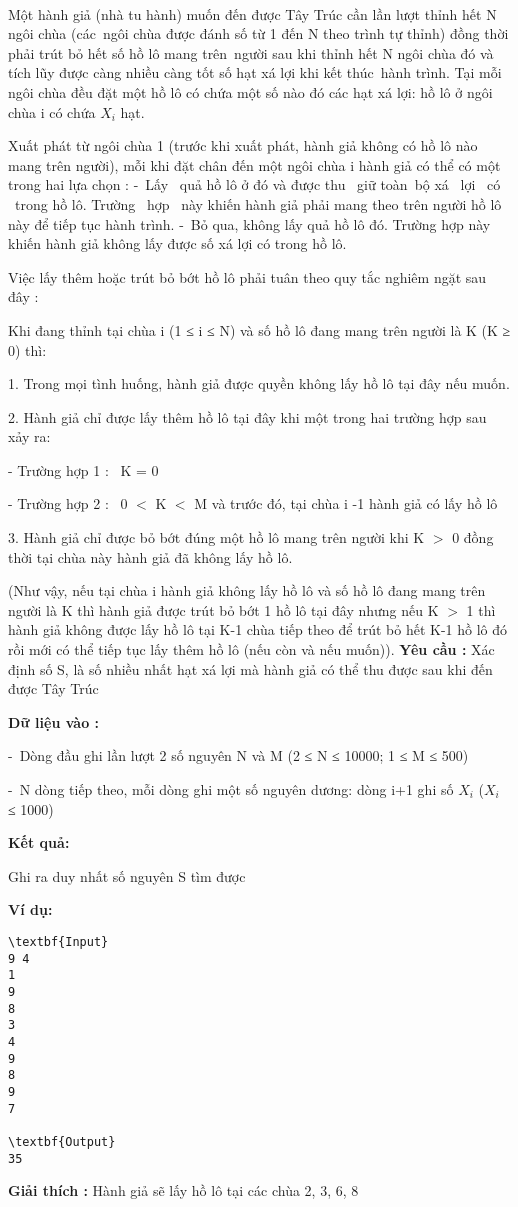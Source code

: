 

 

Một hành giả (nhà tu hành) muốn đến được Tây Trúc cần lần lượt thỉnh hết N ngôi chùa (các ngôi chùa được đánh số từ 1 đến N theo trình tự thỉnh) đồng thời phải trút bỏ hết số hồ lô mang trên người sau khi thỉnh hết N ngôi chùa đó và tích lũy được càng nhiều càng tốt số hạt xá lợi khi kết thúc hành trình. Tại mỗi ngôi chùa đều đặt một hồ lô có chứa một số nào đó các hạt xá lợi: hồ lô ở ngôi  chùa i có chứa $X_{i}$ hạt.

Xuất phát từ ngôi chùa 1 (trước khi xuất phát, hành giả không có hồ lô nào mang trên người), mỗi khi đặt chân đến một ngôi chùa i hành giả có thể có một trong hai lựa chọn : - Lấy  quả hồ lô ở đó và được thu  giữ toàn bộ xá  lợi  có  trong hồ lô. Trường  hợp  này khiến hành giả phải mang theo trên người hồ lô này để tiếp tục hành trình. - Bỏ qua, không lấy quả hồ lô đó. Trường hợp này khiến hành giả không lấy được số xá lợi có trong hồ lô.

Việc lấy thêm hoặc trút bỏ bớt hồ lô phải tuân theo quy tắc nghiêm ngặt sau đây :

Khi đang thỉnh tại chùa i (1 ≤ i ≤ N) và số hồ lô đang mang trên người là K (K ≥ 0) thì:

1. Trong mọi tình huống, hành giả được quyền không lấy hồ lô tại đây nếu muốn.

2. Hành giả chỉ được lấy thêm hồ lô tại đây khi một trong hai trường hợp sau xảy ra:

- Trường hợp 1 :  K = 0

- Trường hợp 2 :  0 $<$ K $<$ M và trước đó, tại chùa i -1 hành giả có lấy hồ lô

3. Hành giả chỉ được bỏ bớt đúng một hồ lô mang trên người khi K $>$ 0 đồng thời tại chùa này hành giả đã không lấy hồ lô.

(Như vậy, nếu tại chùa i hành giả không lấy hồ lô và số hồ lô đang mang trên người là K thì hành giả được trút bỏ bớt 1 hồ lô tại đây nhưng nếu K $>$ 1 thì hành giả không được lấy hồ lô tại K-1 chùa tiếp theo để trút bỏ hết K-1 hồ lô đó rồi mới có thể tiếp tục lấy thêm hồ lô (nếu còn và nếu muốn)). \textbf{ Yêu cầu : } Xác định số S, là số nhiều nhất hạt xá lợi mà hành giả có thể thu được sau khi đến được Tây Trúc




\textbf{Dữ liệu vào :}

- Dòng đầu ghi lần lượt 2 số nguyên N và M (2 ≤ N ≤ 10000; 1 ≤ M ≤ 500)

- N dòng tiếp theo, mỗi dòng ghi một số nguyên dương: dòng i+1 ghi số $X_{i}$ ($X_{i}$ ≤ 1000)




\textbf{Kết quả:}

Ghi ra duy nhất số nguyên S tìm được




\textbf{Ví dụ:}
\begin{verbatim}
\textbf{Input}
9 4
1
9
8
3
4
9
8
9
7

\textbf{Output}
35\end{verbatim}




\textbf{Giải thích : } Hành giả sẽ lấy hồ lô tại các chùa 2, 3, 6, 8
